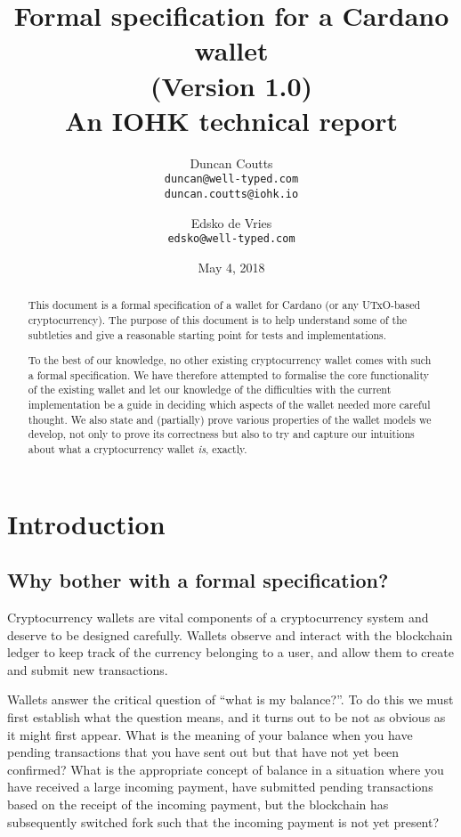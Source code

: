 \documentclass{article}
\theoremstyle{definition}{
  \newtheorem{lemma}{Lemma}[section] %
  \newtheorem{definition}[lemma]{Definition}
}
\theoremstyle{theorem}{
  \newtheorem{invariant}[lemma]{Invariant}
  \newtheorem{proofobligation}[lemma]{Proof Obligation}
}
\numberwithin{equation}{lemma}
\begin{document}
\title{Formal specification for a Cardano wallet \\
       {\small (Version 1.0)} \\
       {\large \sc An IOHK technical report}}
\author{Duncan Coutts \\ {\small \texttt{duncan@well-typed.com}} \\
                         {\small \texttt{duncan.coutts@iohk.io}}
   \and Edsko de Vries \\ {\small \texttt{edsko@well-typed.com}}}
\date{May 4, 2018}

\maketitle

\begin{abstract}
This document is a formal specification of a wallet for Cardano (or any
UTxO-based cryptocurrency). The purpose of this document is to help understand
some of the subtleties and give a reasonable starting point for tests and
implementations.

To the best of our knowledge, no other existing cryptocurrency wallet comes with
such a formal specification. We have therefore attempted to formalise the core
functionality of the existing wallet and let our knowledge of the difficulties
with the current implementation be a guide in deciding which aspects of the
wallet needed more careful thought. We also state and (partially) prove various
properties of the wallet models we develop, not only to prove its correctness
but also to try and capture our intuitions about what a cryptocurrency wallet
\emph{is}, exactly.
\end{abstract}

\section{Introduction}

\subsection{Why bother with a formal specification?}

Cryptocurrency wallets are vital components of a cryptocurrency system and
deserve to be designed carefully. Wallets observe and interact with the
blockchain ledger to keep track of the currency belonging to a user, and allow
them to create and submit new transactions.

Wallets answer the critical question of ``what is my balance?''. To do this
we must first establish what the question means, and it turns out to be not
as obvious as it might first appear. What is the meaning of your balance when
you have pending transactions that you have sent out but that have not yet been
confirmed? What is the appropriate concept of balance in a situation where you
have received a large incoming payment, have submitted pending transactions
based on the receipt of the incoming payment, but the blockchain has
subsequently switched fork such that the incoming payment is not yet present?
\end{document}
